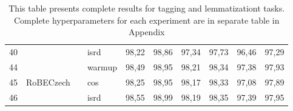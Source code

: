\begin{table}[!ht]
{\begin{tabular}{|l|l|l|l||llllll|}
40 &                              &                         & isrd   & 98,22  & 98,86   & 97,34   & 97,73    & 96,46     & 97,29      \\ \cline{1-2} \cline{4-10} 
44 & \multirow{3}{*}{RoBECzech}   &                         & warmup & 98,49  & 98,95   & 98,21   & 98,34    & 97,38     & 97,93      \\ \cline{1-1} \cline{4-10} 
45 &                              &                         & cos    & 98,25  & 98,95   & 98,17   & 98,33    & 97,08     & 97,89      \\ \cline{1-1} \cline{4-10} 
46 &                              &                         & isrd   & 98,55  & 98,99   & 98,19   & 98,35    & 97,39     & 97,95      \\ \hline
\end{tabular}
}
\caption{This table presents complete results for tagging and lemmatizationt tasks.  Complete hyperparameters for each experiment are in separate table in Appendix %
}
\label{tab:all_res_tl}
\end{table}



